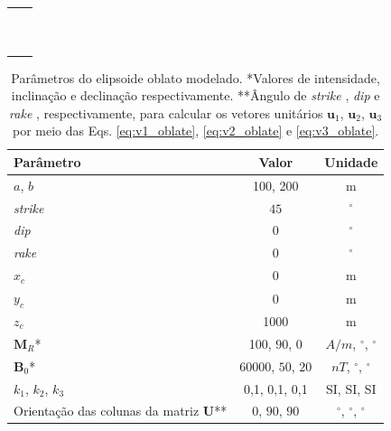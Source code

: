 \begin{table}[h!]
	\begin{center}
		\begin{tabular}{lc}
		
			 &  \\
			 & \\
			 & \\
			 & \\
			& \\
			& \\ 
			& \\
			& \\
			& \\ 
			& \\
\end{tabular}
\end{center}
\end{table}

\begin{table}[h!]
	\begin{center}
		\begin{tabular}{|l|c|c|}
			\hline
			\textbf{Parâmetro}  & \textbf{Valor} & \textbf{Unidade} \\
			\hline 
			$a$, $b$  & 100, 200 & m \\
			\hline
			\textit{strike}   & $45$ &  $^{\circ}$\\
			\hline
			\textit{dip}    & $0$ &  $^{\circ}$\\
			\hline
			\textit{rake}   & $0$  &  $^{\circ}$\\
			\hline
			$x_c $  & 0  & m\\
			\hline          
			$y_c$   & 0  & m\\
			\hline                
			$z_c$   & 1000  & m\\
			\hline
			$\mathbf{M}_{R}$*  & 100, $90$, $0$  & $A/m$, $^{\circ}$, $^{\circ}$\\
			\hline
			$\mathbf{B}_{0}$*    & 60000, $50$, $20$ & $nT$, $^{\circ}$, $^{\circ}$\\
			\hline
			$k_{1}$, $k_{2}$, $k_{3}$   & 0,1, 0,1, 0,1  & SI, SI, SI\\
			\hline
			Orientação das colunas da matriz $\mathbf{U}$**   & $0$, $90$, $90$  &  $^{\circ}$,  $^{\circ}$,  $^{\circ}$\\
			\hline
		\end{tabular}
		\caption{Parâmetros do elipsoide oblato modelado. *Valores de intensidade, inclinação e declinação respectivamente. **Ângulo de \textit{strike} , \textit{dip}  e \textit{rake} , respectivamente, para calcular os vetores unitários $\mathbf{u}_{1}$, $\mathbf{u}_{2}$, $\mathbf{u}_{3}$ por meio das Eqs. \ref{eq:v1_oblate}, \ref{eq:v2_oblate} e \ref{eq:v3_oblate}.}
	\end{center}
	\label{tab:oblate}
\end{table}

